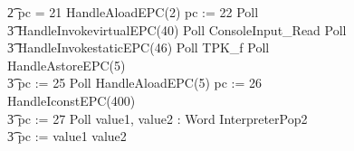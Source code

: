 \begin{figure}[t]
\begin{circus}
    \t2 {} \circelse pc = 21 \circthen HandleAloadEPC(2) \circseq pc := 22 \circseq Poll \circseq \\
    \t3 HandleInvokevirtualEPC(40) \circseq Poll \circseq ConsoleInput\_Read \circseq Poll \circseq \\
    \t3 HandleInvokestaticEPC(46) \circseq Poll \circseq TPK\_f \circseq Poll \circseq HandleAstoreEPC(5) \circseq \\
    \t3 pc := 25 \circseq Poll \circseq HandleAloadEPC(5) \circseq pc := 26 \circseq HandleIconstEPC(400) \circseq \\
    \t3 pc := 27 \circseq Poll \circseq \circvar value1, value2 : Word \circspot InterpreterPop2 \circseq \\
    \t3 pc := \IF value1 \leq value2   \\

\end{circus}
\end{figure}
